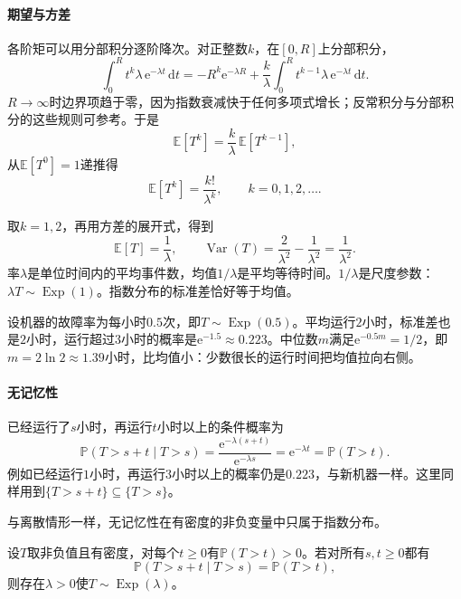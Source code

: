 \paragraph{期望与方差}
各阶矩可以用分部积分逐阶降次。对正整数$k$，在$[0,R]$上分部积分，
\[
  \int_0^{R}t^{k}\lambda\,\mathrm{e}^{-\lambda t}\,\mathrm{d}t
  =-R^{k}\mathrm{e}^{-\lambda R}+\frac{k}{\lambda}\int_0^{R}t^{k-1}\lambda\,\mathrm{e}^{-\lambda t}\,\mathrm{d}t .
\]
$R\to\infty$时边界项趋于零，因为指数衰减快于任何多项式增长；反常积分与分部积分的这些规则可参考。于是
\[
  \mathbb{E}[T^{k}]=\frac{k}{\lambda}\,\mathbb{E}[T^{k-1}],
\]
从$\mathbb{E}[T^{0}]=1$递推得
\begin{equation}
  \mathbb{E}[T^{k}]=\frac{k!}{\lambda^{k}},\qquad k=0,1,2,\dots .
  \label{eq:cdist-exponential-moments-k}
\end{equation}

取$k=1,2$，再用方差的展开式，得到
\begin{equation}
  \mathbb{E}[T]=\frac1\lambda,\qquad \operatorname{Var}(T)=\frac{2}{\lambda^{2}}-\frac{1}{\lambda^{2}}=\frac{1}{\lambda^{2}}.
  \label{eq:cdist-exponential-moments}
\end{equation}
率$\lambda$是单位时间内的平均事件数，均值$1/\lambda$是平均等待时间。$1/\lambda$是尺度参数：$\lambda T\sim\operatorname{Exp}(1)$。指数分布的标准差恰好等于均值。

设机器的故障率为每小时$0.5$次，即$T\sim\operatorname{Exp}(0.5)$。平均运行$2$小时，标准差也是$2$小时，运行超过$3$小时的概率是$\mathrm{e}^{-1.5}\approx0.223$。中位数$m$满足$\mathrm{e}^{-0.5m}=1/2$，即$m=2\ln2\approx1.39$小时，比均值小：少数很长的运行时间把均值拉向右侧。

\paragraph{无记忆性}
已经运行了$s$小时，再运行$t$小时以上的条件概率为
\[
  \mathbb{P}(T>s+t\mid T>s)=\frac{\mathrm{e}^{-\lambda(s+t)}}{\mathrm{e}^{-\lambda s}}=\mathrm{e}^{-\lambda t}=\mathbb{P}(T>t).
\]
例如已经运行$1$小时，再运行$3$小时以上的概率仍是$0.223$，与新机器一样。这里同样用到$\{T>s+t\}\subseteq\{T>s\}$。

与离散情形一样，无记忆性在有密度的非负变量中只属于指数分布。

\begin{theorem}[指数分布的无记忆刻画]
\label{thm:cdist-exponential-memoryless}
设$T$取非负值且有密度，对每个$t\geq0$有$\mathbb{P}(T>t)>0$。若对所有$s,t\geq0$都有
\begin{equation}
  \mathbb{P}(T>s+t\mid T>s)=\mathbb{P}(T>t),
  \label{eq:cdist-memoryless-continuous}
\end{equation}
则存在$\lambda>0$使$T\sim\operatorname{Exp}(\lambda)$。
\end{theorem}

